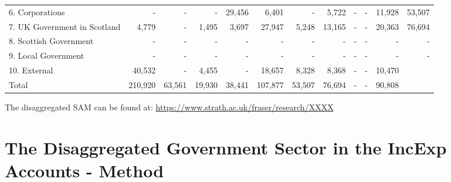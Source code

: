 \begin{sidewaystable}[htbp]
\begin{scriptsize}
\begin{centering}
\begin{doublespacing}
\begin{tabular}{lrrrrrrrrrrr}
  6. Corporations & -    & - & - & 29,456 &   6,401  & - & 5,722 & - & - &
  11,928 & 53,507  \\
  7. UK Government in Scotland  &   4,779  & - & 1,495 & 3,697 & 27,947   & 5,248 &
  13,165 & - &  - & 20,363  & 76,694  \\
  8. Scottish Government  & - & - & - & - & -  & -  & - & - & - & - & -  \\
  9. Local Government  & - & - & - & - & -  & -  & - & - & - & - & -  \\
  10. External  & 40,532   & - & 4,455 & - &  18,657  & 8,328 & 8,368 & - & -
  & 10,470  \bigstrut[b]\\
  \hline
  Total   & 210,920 & 63,561 & 19,930 & 38,441 & 107,877 & 53,507 & 76,694
  & - & - & 90,808 &  \bigstrut[t]\\
    \bottomrule \end{tabular}%
    \bigskip \begin{center}The disaggregated SAM can be found at:
    \url{https://www.strath.ac.uk/fraser/research/XXXX}\end{center} \label{tab:3.5.1}
    \end{doublespacing} \end{centering} \end{scriptsize} \end{sidewaystable}

\newpage


\section{The Disaggregated Government Sector in the IncExp Accounts - Method}
\label{sec:3.5}

\bigskip

